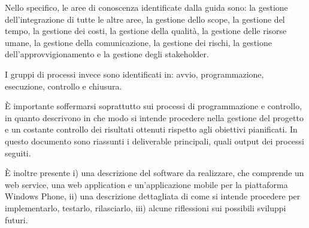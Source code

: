 Nello specifico, le aree di conoscenza identificate dalla guida sono: la gestione dell\rq integrazione di tutte le altre aree, la gestione dello scope, la gestione del tempo, la gestione dei costi, la gestione della qualit\`{a}, la gestione delle risorse umane, la gestione della comunicazione, la gestione dei rischi, la gestione dell\rq approvvigionamento e la gestione degli stakeholder. 

I gruppi di processi invece sono identificati in: avvio, programmazione, esecuzione, controllo e chiusura. 

\`{E} importante soffermarsi soprattutto sui processi di programmazione e controllo, in quanto descrivono in che modo si intende procedere nella gestione del progetto e un costante controllo dei risultati ottenuti rispetto agli obiettivi pianificati. In questo documento sono riassunti i deliverable principali, quali output dei processi seguiti.

\`{E} inoltre presente i) una descrizione del software da realizzare, che comprende un web service, una web application e un'applicazione mobile per la piattaforma Windows Phone, ii) una descrizione dettagliata di come si intende procedere per implementarlo, testarlo, rilasciarlo, iii) alcune riflessioni sui possibili sviluppi futuri.